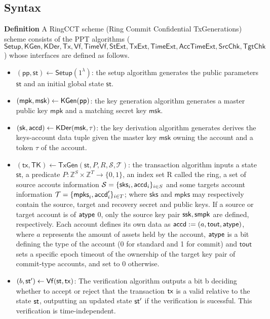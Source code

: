 \subsection{Syntax}
\textbf{Definition} A RingCCT scheme (Ring Commit Confidential TxGenerations) scheme consists of the PPT algorithms ($\mathsf{Setup},\mathsf{KGen},\mathsf{KDer}, \mathsf{Tx},\mathsf{Vf},\mathsf{TimeVf}, \mathsf{StExt},\mathsf{TxExt}, \mathsf{TimeExt}, \mathsf{AccTimeExt}, \mathsf{SrcChk},\mathsf{TgtChk}$) whose interfaces are defined as follows.
\begin{itemize}
        \item $(\mathsf{pp,st}) \gets \mathsf{Setup}(1^\lambda)$: the setup algorithm generates the public parameters $\mathsf{st}$ and an initial global state $\mathsf{st}$.
        \item $(\mathsf{mpk},\mathsf{msk}) \gets \mathsf{KGen}(\mathsf{pp})$: the key generation algorithm generates a master public key $\mathsf{mpk}$ and a matching secret key $\mathsf{msk}$.
        \item $(\mathsf{sk},\mathsf{accd}) \gets \mathsf{KDer}(\mathsf{msk, \tau})$: the key derivation algorithm generates derives the keys-account data tuple given the master key $\mathsf{msk}$ owning the account and a token $\tau$ of the account.
	\item $(\mathsf{tx,TK}) \gets \mathsf{TxGen}(\mathsf{st},P,R,\mathcal{S},\mathcal{T})$: the transaction algorithm inputs a state $\mathsf{st}$, a predicate $P: \mathbb{Z}^S \times \mathbb{Z}^T \rightarrow \{0,1\}$, an index set R called the ring, a set of source accouts information $\mathcal{S} = \{\mathsf{sks}_i, \mathsf{accd}_i\}_{i\in S}$ and some targets account information $\mathcal{T} = \{\mathsf{mpks}_i, \mathsf{accd}'_i\}_{i\in T}$; where $\mathsf{sks}$ and $\mathsf{mpks}$ may respectively contain the source, target and recovery secret and public keys. If a source or target account is of $\mathsf{atype}$ 0, only the source key pair $\mathsf{ssk}, \mathsf{smpk}$ are defined, respectively. Each account defines its own data as $\mathsf{accd} := (a, \mathsf{tout}, \mathsf{atype})$, where $a$ represents the amount of assets held by the account, $\mathsf{atype}$ is a bit defining the type of the account (0 for standard and 1 for commit) and $\mathsf{tout}$ sets a specific epoch timeout of the ownership of the target key pair of commit-type accounts, and set to 0 otherwise. 
        \item $(b,\st') \gets \mathsf{Vf}(\st,\tx)$: The verification algorithm outputs a bit b deciding whether to accept or reject that the transaction $\mathsf{tx}$ is a valid relative to the state $\st$, outputting an updated state $\st'$ if the verification is sucessful. This verification is time-independent.

\end{itemize}
